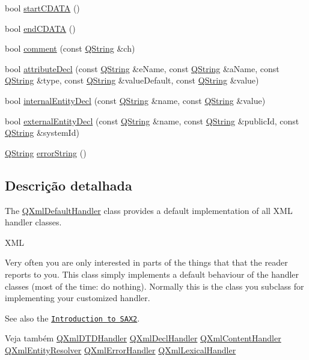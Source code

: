 \begin{DoxyCompactItemize}
bool \hyperlink{class_q_xml_default_handler_a492b3e39f8c41a9f98eb477a975cb383}{start\-C\-D\-A\-T\-A} ()
\item 
bool \hyperlink{class_q_xml_default_handler_ad7a1723ff154aeffcbaac42e4a591186}{end\-C\-D\-A\-T\-A} ()
\item 
bool \hyperlink{class_q_xml_default_handler_a244025ba6bd8815828678aab134064d0}{comment} (const \hyperlink{class_q_string}{Q\-String} \&ch)
\item 
bool \hyperlink{class_q_xml_default_handler_a512b30d75f1836bfe11dfd87cb25a092}{attribute\-Decl} (const \hyperlink{class_q_string}{Q\-String} \&e\-Name, const \hyperlink{class_q_string}{Q\-String} \&a\-Name, const \hyperlink{class_q_string}{Q\-String} \&type, const \hyperlink{class_q_string}{Q\-String} \&value\-Default, const \hyperlink{class_q_string}{Q\-String} \&value)
\item 
bool \hyperlink{class_q_xml_default_handler_a89792dd1b272b7f45bebb8f1eda7ee99}{internal\-Entity\-Decl} (const \hyperlink{class_q_string}{Q\-String} \&name, const \hyperlink{class_q_string}{Q\-String} \&value)
\item 
bool \hyperlink{class_q_xml_default_handler_ae811ac152a3a244b2f5dd12401fa055c}{external\-Entity\-Decl} (const \hyperlink{class_q_string}{Q\-String} \&name, const \hyperlink{class_q_string}{Q\-String} \&public\-Id, const \hyperlink{class_q_string}{Q\-String} \&system\-Id)
\item 
\hyperlink{class_q_string}{Q\-String} \hyperlink{class_q_xml_default_handler_af799a7684337babb971e2e0d8cda7cf1}{error\-String} ()
\end{DoxyCompactItemize}


\subsection{Descrição detalhada}
The \hyperlink{class_q_xml_default_handler}{Q\-Xml\-Default\-Handler} class provides a default implementation of all X\-M\-L handler classes. 

X\-M\-L

Very often you are only interested in parts of the things that that the reader reports to you. This class simply implements a default behaviour of the handler classes (most of the time\-: do nothing). Normally this is the class you subclass for implementing your customized handler.

See also the \href{xml.html#introSAX2}{\tt Introduction to S\-A\-X2}.

\begin{DoxySeeAlso}{Veja também}
\hyperlink{class_q_xml_d_t_d_handler}{Q\-Xml\-D\-T\-D\-Handler} \hyperlink{class_q_xml_decl_handler}{Q\-Xml\-Decl\-Handler} \hyperlink{class_q_xml_content_handler}{Q\-Xml\-Content\-Handler} \hyperlink{class_q_xml_entity_resolver}{Q\-Xml\-Entity\-Resolver} \hyperlink{class_q_xml_error_handler}{Q\-Xml\-Error\-Handler} \hyperlink{class_q_xml_lexical_handler}{Q\-Xml\-Lexical\-Handler} 
\end{DoxySeeAlso}


